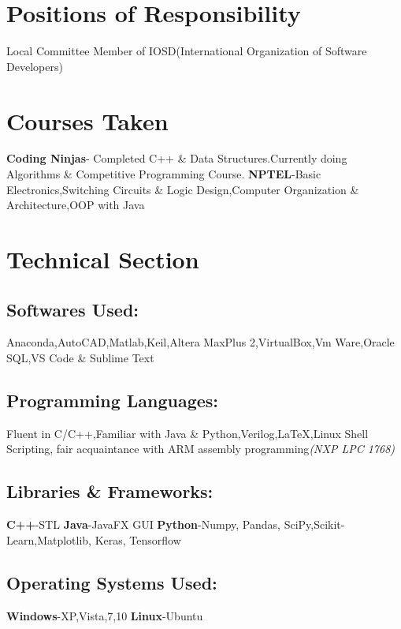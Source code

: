 \documentclass{article}
\begin{document}
\section*{Positions of Responsibility}
    \textmd{Local Committee Member of IOSD(International Organization of Software Developers)}
    \section{Courses Taken} 
    \textbf{Coding Ninjas}- Completed C++ \& Data Structures.Currently doing Algorithms \& Competitive Programming Course.
    \newline
    \textbf{NPTEL}-Basic Electronics,Switching Circuits \& Logic Design,Computer Organization \& Architecture,OOP with Java
    
\section*{Technical Section}
        \subsection*{Softwares Used:}
        Anaconda,AutoCAD,Matlab,Keil,Altera MaxPlus 2,VirtualBox,Vm Ware,Oracle SQL,VS Code \& Sublime Text 
        \subsection*{Programming Languages:}
        Fluent in C/C++,Familiar with Java \& Python,Verilog,{\LaTeX},Linux Shell Scripting,
        fair acquaintance with ARM assembly programming\textit{(NXP LPC 1768)}
        \subsection*{Libraries \& Frameworks:}
            \textbf{C++}-STL    
            \textbf{Java}-JavaFX GUI
            \textbf{Python}-Numpy, Pandas, SciPy,Scikit-Learn,Matplotlib, Keras, Tensorflow    
        \subsection*{Operating Systems Used:}
        \textbf{Windows}-XP,Vista,7,10 
        \textbf{Linux}-Ubuntu
\end{document}
